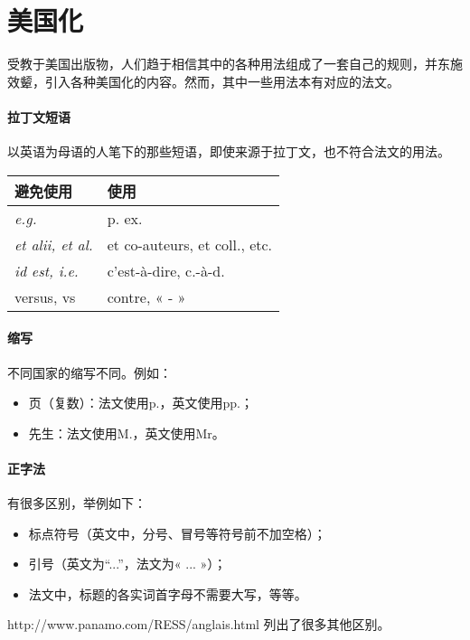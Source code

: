 \section{美国化}

受教于美国出版物，人们趋于相信其中的各种用法组成了一套自己的规则，并东施效颦，引入各种美国化的内容。然而，其中一些用法本有对应的法文。

\paragraph*{拉丁文短语} 以英语为母语的人笔下的那些短语，即使来源于拉丁文，也不符合法文的用法。

\begin{center}
    \begin{tabular}{|l|l|}
        \hline
        避免使用 & 使用 \\
        \hline
        \emph{e.g.} & p. ex. \\
        \emph{et alii, et al.} & et co-auteurs, et coll., etc.\\
        \emph{id est, i.e.} & c'est-à-dire, c.-à-d.\\
        versus, vs & contre, « - » \\
        \hline
    \end{tabular}
\end{center}

\paragraph*{缩写} 不同国家的缩写不同。例如：

\begin{itemize}
    \item 页（复数）：法文使用p.，英文使用pp.；
    \item 先生：法文使用M.，英文使用Mr。
\end{itemize}

\paragraph*{正字法} 有很多区别，举例如下：

\begin{itemize}
    \item 标点符号（英文中，分号、冒号等符号前不加空格）；
    \item 引号（英文为``...''，法文为« ... »）；
    \item 法文中，标题的各实词首字母不需要大写，等等。
\end{itemize}

http://www.panamo.com/RESS/anglais.html 列出了很多其他区别。